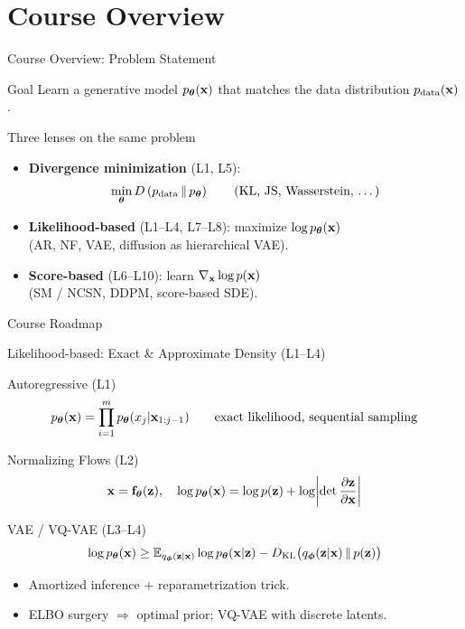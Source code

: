 \documentclass{beamer}
\begin{document}
\section{Course Overview}
\begin{frame}{Course Overview: Problem Statement}
	\begin{block}{Goal}
		Learn a generative model $p_{\boldsymbol{\theta}}(\mathbf{x})$ that matches the data distribution $p_{\text{data}}(\mathbf{x})$.
	\end{block}
	\begin{block}{Three lenses on the same problem}
		\begin{itemize}
			\item \textbf{Divergence minimization} (L1, L5):
			\[
				\min_{\boldsymbol{\theta}} D\left(p_{\text{data}} \,\|\, p_{\boldsymbol{\theta}}\right)
				\qquad (\text{KL, JS, Wasserstein, \dots})
			\]
			\vspace{-0.5cm}
			\item \textbf{Likelihood-based} (L1--L4, L7--L8): maximize $\log p_{\boldsymbol{\theta}}(\mathbf{x})$ \\
			(AR, NF, VAE, diffusion as hierarchical VAE).
			\item \textbf{Score-based} (L6--L10): learn $\nabla_{\mathbf{x}} \log p(\mathbf{x})$ \\
			(SM / NCSN, DDPM, score-based SDE).
		\end{itemize}
	\end{block}
\end{frame}
\begin{frame}{Course Roadmap}
	\renderTaxonomy{}
\end{frame}
\begin{frame}{Likelihood-based: Exact \& Approximate Density (L1--L4)}
	\begin{block}{Autoregressive (L1)}
		\vspace{-0.3cm}
		\[
			p_{\boldsymbol{\theta}}(\mathbf{x})=\prod_{i=1}^m p_{\boldsymbol{\theta}}(x_j | \mathbf{x}_{1:j-1})
			\qquad \text{exact likelihood, sequential sampling}
		\]
	\end{block}
	\begin{block}{Normalizing Flows (L2)}
		\vspace{-0.3cm}
		\[
			\mathbf{x}=\mathbf{f}_{\boldsymbol{\theta}}(\mathbf{z}),
			\quad
			\log p_{\boldsymbol{\theta}}(\mathbf{x})=\log p(\mathbf{z})+\log\!\left|\det \frac{\partial \mathbf{z}}{\partial \mathbf{x}}\right|
		\]
	\end{block}
	\begin{block}{VAE / VQ-VAE (L3--L4)}
		\vspace{-0.3cm}
		\[
			\log p_{\boldsymbol{\theta}}(\mathbf{x})\ge \mathbb{E}_{q_{\boldsymbol{\phi}}(\mathbf{z}|\mathbf{x})}\log p_{\boldsymbol{\theta}}(\mathbf{x}|\mathbf{z})-D_\mathrm{KL}\bigl(q_{\boldsymbol{\phi}}(\mathbf{z}|\mathbf{x})\,\|\,p(\mathbf{z})\bigr)
		\]
		\vspace{-0.5cm}
		\begin{itemize}
			\item Amortized inference + reparametrization trick.
			\item ELBO surgery $\Rightarrow$ optimal prior; VQ-VAE with discrete latents.
		\end{itemize}
	\end{block}
\end{frame}
\end{document}
